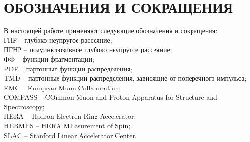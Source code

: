\newpage

\chapter*{ОБОЗНАЧЕНИЯ И СОКРАЩЕНИЯ}
\thispagestyle{empty}
В настоящей работе применяют следующие обозначения и сокращения: \\
ГНР -- глубоко неупругое рассеяние; \\
ПГНР -- полуинклюзивное глубоко неупругое рассеяние; \\
ФФ -- функции фрагментации; \\
PDF -- партонные функции распределения; \\ 
TMD -- партонные функции распределения, зависящие от поперечного импульса; \\
EMC -- European Muon Collaboration; \\
COMPASS -- COmmon Muon and Proton Apparatus for Structure and
Spectroscopy; \\
HERA -- Hadron Electron Ring Accelerator; \\
HERMES -- HERA MEasurement of Spin; \\
SLAC -- Stanford Linear Accelerator Center.
